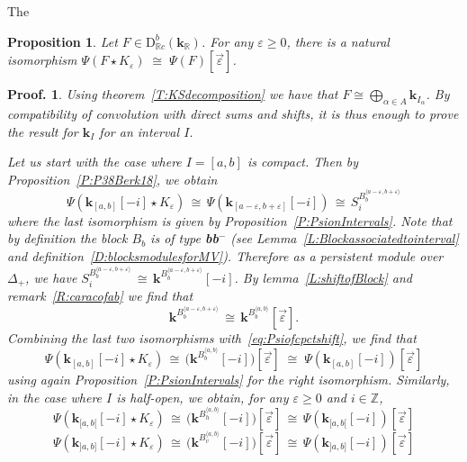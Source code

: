 \documentclass[a4paper, english, 11pt]{article}
\newcommand{\kk}[0]{\textbf{k}}
\newcommand{\0}{\vec{0}}
\newcommand{\R}[0]{\mathbb{R}}
\newcommand{\D}[0]{\text{D}}
\newtheorem{prop}{Proposition}[section]
\newtheorem*{pf}{Proof.} }
\begin{document}
The 
\begin{prop}\label{P:Psipreservesinterl}Let $F \in \D^b_{\R c}(\kk_\R)$. For any $\varepsilon \geq 0$, there is a natural isomorphism 
$ \Psi(F \star K_{\varepsilon}) \; \cong \; \Psi(F)[\vec{\varepsilon}]$.
\end{prop}
\begin{pf}
 Using theorem~\ref{T:KSdecomposition} we have that $F\cong \bigoplus_{\alpha \in A} \kk_{I_\alpha} $. By compatibility of convolution with direct sums and shifts, it is thus enough to prove the result for $\kk_I$ for an interval $I$. 
 
Let us start with the case where $I= [a,b]$ is compact.    Then by Proposition~\ref{P:P38Berk18}, we obtain 
\begin{equation}\label{eq:Psiofcpctshift}
 \Psi(\kk_{[a,b]}[-i] \star K_{\varepsilon}) \,\cong\,  \Psi(\kk_{[a-\varepsilon,b+\varepsilon]}[-i])
 \, \cong \, S_i^{B_{b}^{\langle a-\varepsilon, b +\varepsilon\rangle}}
\end{equation}
where the last isomorphism is given by Proposition~\ref{P:PsionIntervals}. Note that by definition the block $B_b$ is of type \textbf{bb}$^{-}$ (see Lemma~\ref{L:Blockassociatedtointerval} and definition~\ref{D:blocksmodulesforMV}). Therefore as a persistent module over $\Delta_+$, we have 
$S_i^{B_{b}^{\langle a-\varepsilon, b +\varepsilon\rangle}} \,\cong\, \kk^{B_{b}^{\langle a-\varepsilon, b+\varepsilon \rangle}} [-i]$. By lemma~\ref{L:shiftofBlock} and remark~\ref{R:caracofab} we find that 
$$\kk^{B_{b}^{\langle a-\varepsilon, b+\varepsilon \rangle}} \, \cong \, \kk^{B_{b}^{\langle a, b\rangle}}[\vec{\varepsilon}]. $$
Combining the last two isomorphisms with~\eqref{eq:Psiofcpctshift}, we find that 
\begin{equation}
 \Psi(\kk_{[a,b]}[-i] \star K_{\varepsilon}) \,\cong\, \Big(\kk^{B_{b}^{\langle a, b\rangle}}[-i]\Big)[\vec{\varepsilon}] \; \cong \;  \Psi(\kk_{[a,b]}[-i])[\vec{\varepsilon}]
\end{equation}
using again Proposition~\ref{P:PsionIntervals} for the right isomorphism.
Similarly, in the case where $I$ is half-open, we obtain, for any $\varepsilon\geq 0$ and $i\in \mathbb{Z}$, 
\begin{equation}
 \Psi(\kk_{[a,b[} [-i] \star K_{\varepsilon}) \,\cong \, \Big(\kk^{B_{h}^{\langle a, b\rangle}}[-i]\Big)[\vec{\varepsilon}] \, \cong\, \Psi(\kk_{[a,b[} [-i])[\vec{\varepsilon}] 
 \end{equation}
 \begin{equation}
 \Psi(\kk_{]a,b]} [-i] \star K_{\varepsilon})  \,\cong \, \Big(\kk^{B_{v}^{\langle a, b\rangle}}[-i]\Big)[\vec{\varepsilon}] \, \cong\,\Psi(\kk_{]a,b]} [-i])[\vec{\varepsilon}]
\end{equation}


\end{pf}
\end{document}

